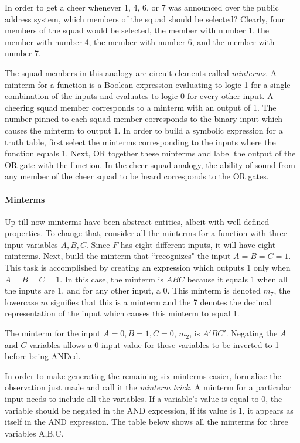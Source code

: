 In order to get a cheer whenever 1, 4, 6, or 7 was announced
over the public address system, which members of the squad should be
selected?  Clearly, four members of the squad would be selected, the member
with number 1, the member with number 4, the member with number 6,
and the member with number 7.

The squad members in this analogy are circuit elements called
\textit{minterms}.  A minterm for a function
is a Boolean expression evaluating to logic 1 for a single
combination of the inputs and evaluates to logic 0 for every
other input.  A cheering squad member corresponds to a minterm with
an output of 1.  The number pinned to each squad member corresponds
to the binary input which causes the minterm to output 1.  In order
to build a symbolic expression for a truth table, first select the
minterms corresponding to the inputs where the function equals 1.
Next, OR together these minterms and label the output of
the OR gate with the function.  In the cheer squad analogy, the ability of
sound from any member of the cheer squad to be heard corresponds
to the OR gates.

\paragraph{Minterms}
Up till now minterms have been abstract entities, albeit with
well-defined properties.  To change that, consider all
the minterms for a function  with three input variables
$A,B,C$.  Since $F$ has eight different inputs, it will have eight
minterms.  Next, build the minterm that ``recognizes" the input $A=B=C=1$.
This task is accomplished by creating an expression which outputs 1 only when
$A=B=C=1$.  In this case, the minterm is $ABC$ because it equals
1 when all the inputs are 1, and for any other input, a 0.
This minterm is denoted $m_7$, the lowercase $m$ signifies that
this is a minterm and the 7 denotes the decimal representation
of the input which causes this minterm to equal 1.

The minterm
for the input $A=0, B=1, C=0$, $m_2$, is $A'BC'$.  Negating the
$A$ and $C$ variables allows a 0 input value for these variables to
be inverted to 1 before being ANDed.

In order to make generating
the remaining six minterms easier, formalize the observation
just made and call it the \textit{minterm trick}.
 \label{page:MinTrick}
A minterm for a particular input needs to include all the variables.
If a variable's value is equal to 0, the variable should be negated in
the AND expression, if its value is 1, it appears as itself in the
AND expression. The table below shows all the minterms for three
variables A,B,C.

